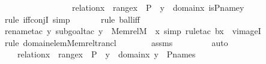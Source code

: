 \begin{isabellebody}
\ \ \ \ \ \ \isamarkupfalse%
\isanewline
\ \ \ \ \isamarkupfalse%
\ \isamarkupfalse%
\ {\isachardoublequoteopen}{\isachardot}{\kern0pt}{\isachardot}{\kern0pt}{\isachardot}{\kern0pt}\ {\isasymlongleftrightarrow}\ relation{\isacharparenleft}{\kern0pt}x{\isacharparenright}{\kern0pt}\ {\isasymand}\ range{\isacharparenleft}{\kern0pt}x{\isacharparenright}{\kern0pt}\ {\isasymsubseteq}\ P\ {\isasymand}\ {\isacharparenleft}{\kern0pt}{\isasymforall}y\ {\isasymin}\ domain{\isacharparenleft}{\kern0pt}x{\isacharparenright}{\kern0pt}{\isachardot}{\kern0pt}\ is{\isacharunderscore}{\kern0pt}P{\isacharunderscore}{\kern0pt}name{\isacharparenleft}{\kern0pt}y{\isacharparenright}{\kern0pt}\ {\isacharequal}{\kern0pt}\ {}{\isacharparenright}{\kern0pt}{\isachardoublequoteclose}\ \isanewline
\ \ \ \ \ \ \isamarkupfalse%
{\isacharparenleft}{\kern0pt}rule\ iff{\isacharunderscore}{\kern0pt}conjI{\isacharcomma}{\kern0pt}\ simp{\isacharparenright}{\kern0pt}{\isacharplus}{\kern0pt}\isanewline
\ \ \ \ \ \ \isamarkupfalse%
{\isacharparenleft}{\kern0pt}rule\ ball{\isacharunderscore}{\kern0pt}iff{\isacharparenright}{\kern0pt}\isanewline
\ \ \ \ \ \ \isamarkupfalse%
{\isacharparenleft}{\kern0pt}rename{\isacharunderscore}{\kern0pt}tac\ y{\isacharcomma}{\kern0pt}\ subgoal{\isacharunderscore}{\kern0pt}tac\ {\isachardoublequoteopen}y\ {\isasymin}\ Memrel{\isacharparenleft}{\kern0pt}M{\isacharparenright}{\kern0pt}{\isacharcircum}{\kern0pt}{\isacharplus}{\kern0pt}\ {\isacharminus}{\kern0pt}{\isacharbackquote}{\kern0pt}{\isacharbackquote}{\kern0pt}\ {\isacharbraceleft}{\kern0pt}x{\isacharbraceright}{\kern0pt}{\isachardoublequoteclose}{\isacharcomma}{\kern0pt}\ simp{\isacharcomma}{\kern0pt}\ rule{\isacharunderscore}{\kern0pt}tac\ b{\isacharequal}{\kern0pt}x\ \ vimageI{\isacharparenright}{\kern0pt}\isanewline
\ \ \ \ \ \ \ \isamarkupfalse%
{\isacharparenleft}{\kern0pt}rule\ domain{\isacharunderscore}{\kern0pt}elem{\isacharunderscore}{\kern0pt}Memrel{\isacharunderscore}{\kern0pt}trancl{\isacharparenright}{\kern0pt}\isanewline
\ \ \ \ \ \ \isamarkupfalse%
\ assms{}\ \isanewline
\ \ \ \ \ \ \isamarkupfalse%
\ auto\ \isanewline
\ \ \ \ \isamarkupfalse%
\ \isamarkupfalse%
\ {\isachardoublequoteopen}{\isachardot}{\kern0pt}{\isachardot}{\kern0pt}{\isachardot}{\kern0pt}\ {\isasymlongleftrightarrow}\ relation{\isacharparenleft}{\kern0pt}x{\isacharparenright}{\kern0pt}\ {\isasymand}\ range{\isacharparenleft}{\kern0pt}x{\isacharparenright}{\kern0pt}\ {\isasymsubseteq}\ P\ {\isasymand}\ {\isacharparenleft}{\kern0pt}{\isasymforall}y\ {\isasymin}\ domain{\isacharparenleft}{\kern0pt}x{\isacharparenright}{\kern0pt}{\isachardot}{\kern0pt}\ y\ {\isasymin}\ P{\isacharunderscore}{\kern0pt}names{\isacharparenright}{\kern0pt}{\isachardoublequoteclose}\ \isanewline

\end{isabellebody}
